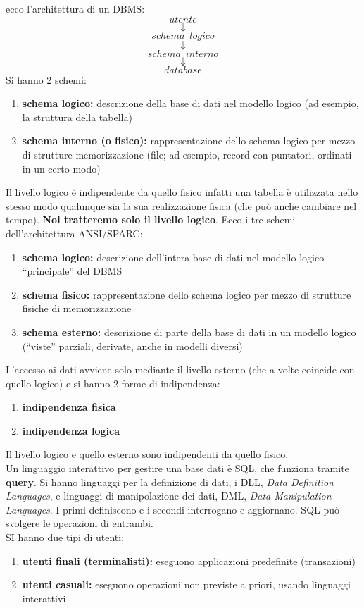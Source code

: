 \documentclass[a4paper,12pt, oneside]{book}
\begin{document}
ecco l'architettura di un DBMS:
$$utente$$
$$\downarrow$$
$$schema\,\,\,logico$$
$$\downarrow$$
$$schema\,\,\,interno$$
$$\downarrow$$
$$database$$
Si hanno 2 schemi:
\begin{enumerate}
\item \textbf{schema logico:} descrizione della base
di dati nel modello logico (ad esempio,
la struttura della tabella)
\item \textbf{schema interno (o fisico):}
rappresentazione dello schema logico
per mezzo di strutture memorizzazione
(file; ad esempio, record con puntatori,
ordinati in un certo modo)
\end{enumerate}
Il livello logico è indipendente da quello
fisico infatti una tabella è utilizzata nello stesso modo
qualunque sia la sua realizzazione fisica
(che può anche cambiare nel tempo). \textbf{Noi tratteremo solo il livello logico}.
Ecco i tre schemi dell'architettura ANSI/SPARC:
\begin{enumerate}
\item \textbf{schema logico: }descrizione dell'intera base di
dati nel modello logico “principale” del DBMS
\item \textbf{schema fisico: }rappresentazione dello
schema logico per mezzo di strutture fisiche
di memorizzazione
\item\textbf{ schema esterno:} descrizione di parte della
base di dati in un modello logico (“viste”
parziali, derivate, anche in modelli diversi)
\end{enumerate}
L'accesso ai dati avviene solo mediante il livello esterno (che a volte coincide con quello logico) e si hanno 2 forme di indipendenza:
\begin{enumerate}
\item \textbf{indipendenza fisica} 
\item \textbf{indipendenza logica}
\end{enumerate}
Il livello logico e quello esterno sono
indipendenti da quello fisico.\\
Un linguaggio interattivo per gestire una base dati è SQL, che funziona tramite \textbf{query}. Si hanno linguaggi per la definizione di dati, i DLL, \textit{Data Definition Languages}, e linguaggi di manipolazione dei dati, DML, \textit{Data Manipulation Languages}. I primi definiscono e i secondi interrogano e aggiornano. SQL può svolgere le operazioni di entrambi.\\
SI hanno due tipi di utenti:
\begin{enumerate}
\item \textbf{utenti finali (terminalisti):} eseguono applicazioni
predefinite (transazioni)
\item \textbf{utenti casuali:} eseguono operazioni non previste
a priori, usando linguaggi interattivi
\end{enumerate}
\end{document}
